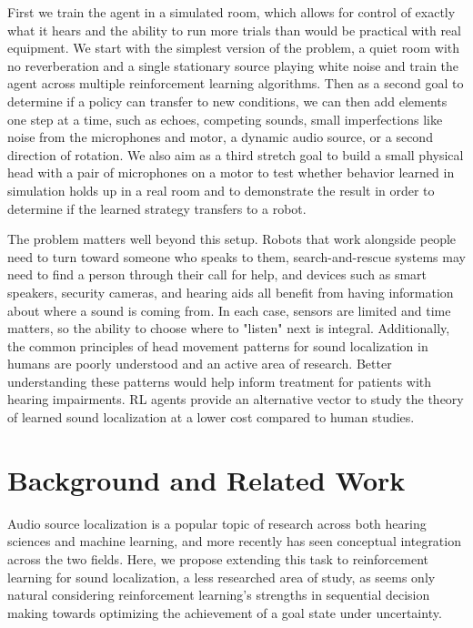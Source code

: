 \documentclass{article}
\begin{document}
First we train the agent in a simulated room, which allows for control of exactly what it hears and the ability to run more trials than would be practical with real equipment. We start with the simplest version of the problem, a quiet room with no reverberation and a single stationary source playing white noise and train the agent across multiple reinforcement learning algorithms. Then as a second goal to determine if a policy can transfer to new conditions, we can then add elements one step at a time, such as echoes, competing sounds, small imperfections like noise from the microphones and motor, a dynamic audio source, or a second direction of rotation. We also aim as a third stretch goal to build a small physical head with a pair of microphones on a motor to test whether behavior learned in simulation holds up in a real room and to demonstrate the result in order to determine if the learned strategy transfers to a robot.

The problem matters well beyond this setup. Robots that work alongside people need to turn toward someone who speaks to them, search-and-rescue systems may need to find a person through their call for help, and devices such as smart speakers, security cameras, and hearing aids all benefit from having information about where a sound is coming from. In each case, sensors are limited and time matters, so the ability to choose where to "listen" next is integral. Additionally, the common principles of head movement patterns for sound localization in humans are poorly understood and an active area of research. Better understanding these patterns would help inform treatment for patients with hearing impairments. RL agents provide an alternative vector to study the theory of learned sound localization at a lower cost compared to human studies. 

\section{Background and Related Work}

Audio source localization is a popular topic of research across both hearing sciences and machine learning, and more recently has seen conceptual integration across the two fields. Here, we propose extending this task to reinforcement learning for sound localization, a less researched area of study, as seems only natural considering reinforcement learning's strengths in sequential decision making towards optimizing the achievement of a goal state under uncertainty.
\end{document}
